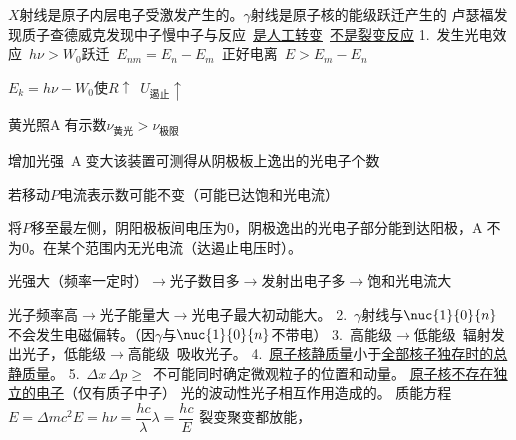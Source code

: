 \hspace{1.5em}$X$射线是原子内层电子受激发产生的。$\gamma$射线是原子核的能级跃迁产生的
卢瑟福发现质子\quad 查德威克发现中子\qquad 慢中子与反应\ \underline{是人工转变}\ \underline{不是裂变反应} %
1.\ 发生光电效应\ $h\nu>W_0$\quad 跃迁\ $E_{nm}=E_n-E_m$\ 正好\quad 电离\ $E>E_m-E_n$ %

$E_k=h\nu-W_0$\hfill 使$R\uparrow$\ $U_{\text{遏止}}\uparrow$ %

黄光照\textcircled{A}有示数\quad $\nu_{\text{黄光}}>\nu_{\text{极限}}$ %

增加光强\ \textcircled{A}变大\qquad 该装置可测得从阴极板上逸出的光电子个数

若移动$P$电流表示数可能不变（可能已达饱和光电流） %

将$P$移至最左侧，阴阳极板间电压为0，阴极逸出的光电子部分能到达阳极，\textcircled{A}不为0。在某个范围内无光电流（达遏止电压时）。

光强大（频率一定时）$\to$光子数目多$\to$发射出电子多$\to$饱和光电流大

光子频率高$\to$光子能量大$\to$光电子最大初动能大。
2.\ $\gamma$射线与$\nuc{1}{0}{n}$不会发生电磁偏转。（因$\gamma$与$\nuc{1}{0}{n}$不带电）
3.\ 高能级$\to$低能级\ 辐射发出光子，低能级$\to$高能级\ 吸收光子。
4.\ \underline{原子核静质量}小于\underline{全部核子独存时的总静质量}。 %
5.\ $\Delta x\,\Delta p\ge$\ 不可能同时确定微观粒子的位置和动量。 %
\underline{原子核不存在独立的电子}（仅有质子中子）
光的波动性光子相互作用造成的。
质能方程\quad $E=\Delta mc^2$\qquad $E=h\nu=\dfrac{hc}{\lambda}$\qquad $\lambda=\dfrac{hc}{E}$
裂变聚变都放能，

